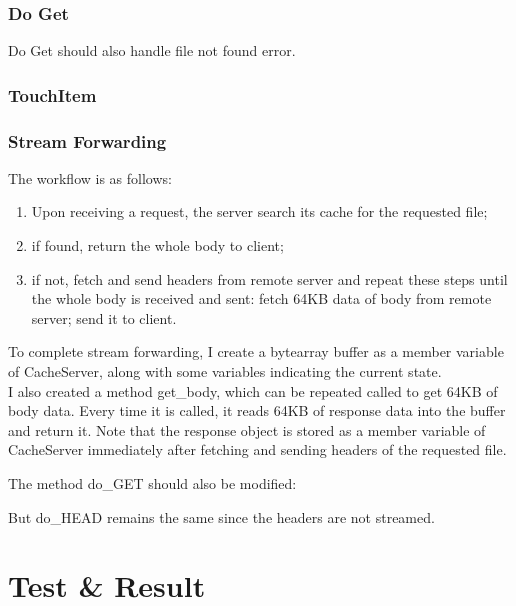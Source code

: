 \documentclass[12pt,a4paper,UTF8]{article}
\begin{document}
\subsubsection{Do Get}
Do Get should also handle file not found error.


\subsubsection{TouchItem}


\subsubsection{Stream Forwarding}
The workflow is as follows:
\begin{enumerate}
	\item Upon receiving a request, the server search its cache for the requested file;
	\item if found, return the whole body to client;
	\item if not, fetch and send headers from remote server and repeat these steps until the whole body is received and sent:
	\subitem fetch 64KB data of body from remote server;
	\subitem send it to client.
\end{enumerate}
To complete stream forwarding, I create a bytearray buffer as a member variable of CacheServer, along with some variables indicating the current state. \\
I also created a method get\_body, which can be repeated called to get 64KB of body data. Every time it is called, it reads 64KB of response data into the buffer and return it. Note that the response object is stored as a member variable of CacheServer immediately after fetching and sending headers of the requested file.

The method do\_GET should also be modified:

But do\_HEAD remains the same since the headers are not streamed.

\section{Test \& Result}
\end{document}

